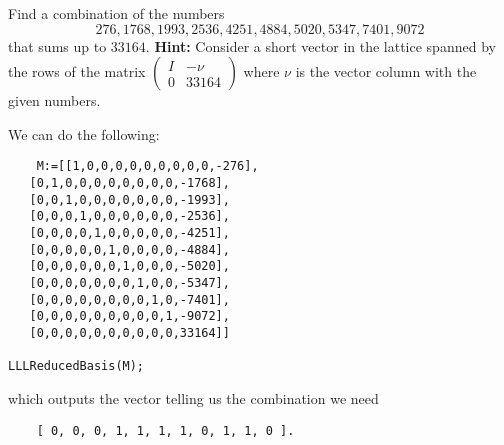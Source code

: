 \documentclass[leqno]{article}
\begin{document}
\setcounter{problem}{27}
\newpage
\begin{problem}
Find a combination of the numbers
\[
276,1768,1993,2536, 4251,4884,5020, 5347,7401,9072
\]
that sums up to $33164$. \textbf{Hint:} Consider a short vector in the lattice spanned by the rows of the matrix $\begin{pmatrix} I & -\nu\\ 0 & 33164\end{pmatrix}$ where $\nu$ is the vector column with the given numbers.
\end{problem}
\begin{solution}
We can do the following:
\begin{verbatim}
    M:=[[1,0,0,0,0,0,0,0,0,0,-276],
   [0,1,0,0,0,0,0,0,0,0,-1768],
   [0,0,1,0,0,0,0,0,0,0,-1993],
   [0,0,0,1,0,0,0,0,0,0,-2536],
   [0,0,0,0,1,0,0,0,0,0,-4251],
   [0,0,0,0,0,1,0,0,0,0,-4884],
   [0,0,0,0,0,0,1,0,0,0,-5020],
   [0,0,0,0,0,0,0,1,0,0,-5347],
   [0,0,0,0,0,0,0,0,1,0,-7401],
   [0,0,0,0,0,0,0,0,0,1,-9072],
   [0,0,0,0,0,0,0,0,0,0,33164]]

LLLReducedBasis(M);
\end{verbatim}
which outputs the vector telling us the combination we need
\begin{verbatim}
    [ 0, 0, 0, 1, 1, 1, 1, 0, 1, 1, 0 ].
\end{verbatim}
\end{solution}
\end{document}
